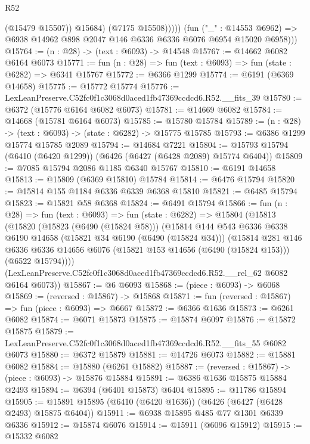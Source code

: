 \begin{lexlean}{R52}
\begin{coremodule}
                    (@15479 @15507))
                  @15684)
                (@7175 @15508)))))
        (fun ("_" : @14553 @6962) =>
        @6938 @14962 @898 @2047 @146 @6336 @6336 @6076 @6954 @15020 @6958)))
@15764 := (n : @28) -> (text : @6093) -> @14548
@15767 := @14662 @6082 @6164 @6073
@15771 := fun (n : @28) => fun (text : @6093) => fun (state : @6282) => @6341 @15767
@15772 := @6366 @1299
@15774 := @6191 (@6369 @14658)
@15775 := @15772 @15774
@15776 := LexLeanPreserve.C52fc0f1c3068d0aced1fb47369ccdcd6.R52.__fits_39
@15780 := @6372 (@15776 @6164 @6082 @6073)
@15781 := @14669 @6082
@15784 := @14668 (@15781 @6164 @6073)
@15785 := @15780 @15784
@15789 := (n : @28) -> (text : @6093) -> (state : @6282) -> @15775 @15785
@15793 := @6386 @1299 @15774 @15785 @2089
@15794 := @14684 @7221
@15804 := @15793 @15794 (@6410 (@6420 @1299)) (@6426 (@6427 (@6428 @2089) @15774 @6404))
@15809 := @7085 @15794 @2086 @1185 @6340 @15767
@15810 := @6191 @14658
@15813 := @15809 (@6369 @15810) @15784
@15814 := @6476 @15794
@15820 := @15814 @155 @1184 @6336 @6339 @6368 @15810
@15821 := @6485 @15794
@15823 := @15821 @58 @6368
@15824 := @6491 @15794
@15866 := fun (n : @28) =>
  fun (text : @6093) =>
  fun (state : @6282) =>
  @15804
    (@15813
      (@15820
        (@15823 (@6490 (@15824 @58)))
        (@15814
          @144
          @543
          @6336
          @6338
          @6190
          @14658
          (@15821 @34 @6190 (@6490 (@15824 @34)))
          (@15814
            @281
            @146
            @6336
            @6336
            @14656
            @6076
            (@15821 @153 @14656 (@6490 (@15824 @153)))
            (@6522 @15794))))
      (LexLeanPreserve.C52fc0f1c3068d0aced1fb47369ccdcd6.R52.__rel_62 @6082 @6164 @6073))
@15867 := @6 @6093
@15868 := (piece : @6093) -> @6068
@15869 := (reversed : @15867) -> @15868
@15871 := fun (reversed : @15867) => fun (piece : @6093) => @6667
@15872 := @6366 @1636
@15873 := @6261 @6082
@15874 := @6071 @15873
@15875 := @15874 @6097
@15876 := @15872 @15875
@15879 := LexLeanPreserve.C52fc0f1c3068d0aced1fb47369ccdcd6.R52.__fits_55 @6082 @6073
@15880 := @6372 @15879
@15881 := @14726 @6073
@15882 := @15881 @6082
@15884 := @15880 (@6261 @15882)
@15887 := (reversed : @15867) -> (piece : @6093) -> @15876 @15884
@15891 := @6386 @1636 @15875 @15884 @2493
@15894 := @6394 (@6401 @15873) @6404
@15895 := @11786 @15894
@15905 := @15891 @15895 (@6410 (@6420 @1636)) (@6426 (@6427 (@6428 @2493) @15875 @6404))
@15911 := @6938 @15895 @485 @77 @1301 @6339 @6336
@15912 := @15874 @6076
@15914 := @15911 (@6096 @15912)
@15915 := @15332 @6082

\end{coremodule}
\end{lexlean}
